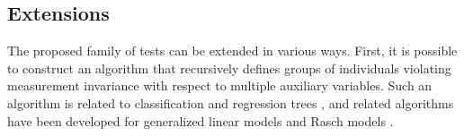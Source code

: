 \documentclass[man]{apa}
\begin{document}
\subsection{Extensions}
The proposed family of tests can be extended in various ways.  First,
it is possible to construct an algorithm that recursively defines
groups of individuals violating measurement invariance with respect to
multiple auxiliary variables.  Such an algorithm is related to 
classification and regression trees \cite{BreFri84,MerSha10,StrMal09},
and related algorithms have been developed for generalized linear
models \cite{ZeiHot08} and Rasch models \cite{KopZei10}.

\end{document}
